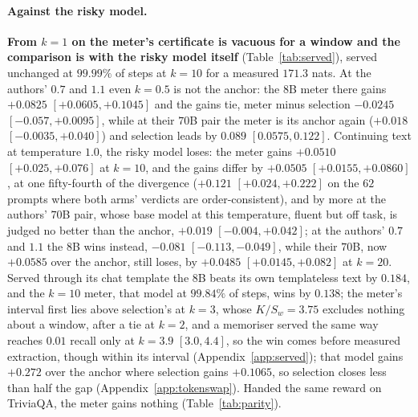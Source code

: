 \paragraph{Against the risky model.} \textbf{From $k=1$ on the meter's certificate is vacuous for a window
and the comparison is with the risky model itself} (Table~\ref{tab:served}), served unchanged at
$99.99\%$ of steps at $k=10$ for a measured $171.3$ nats. At the authors' $0.7$ and $1.1$ even $k=0.5$ is not
the anchor: the $8$B meter there gains $+0.0825$ $[+0.0605, +0.1045]$ and the gains tie, meter minus
selection $-0.0245$ $[-0.057, +0.0095]$, while at their $70$B pair the meter is its anchor again ($+0.018$
$[-0.0035, +0.040]$) and selection leads by $0.089$ $[0.0575, 0.122]$. Continuing text at temperature
$1.0$, the risky model loses: the meter gains $+0.0510$ $[+0.025, +0.076]$ at $k=10$, and the gains differ by $+0.0505$ $[+0.0155, +0.0860]$, at one fifty-fourth of the divergence ($+0.121$
$[+0.024, +0.222]$ on the $62$ prompts where both arms' verdicts are order-consistent), and by more at the
authors' $70$B pair, whose base model at this temperature, fluent but off task, is judged no better than the
anchor, $+0.019$ $[-0.004, +0.042]$; at the authors' $0.7$ and $1.1$ the $8$B wins instead, $-0.081$ $[-0.113, -0.049]$, while their $70$B, now $+0.0585$ over the anchor, still loses, by $+0.0485$ $[+0.0145, +0.082]$ at $k=20$. Served through its chat
template the $8$B beats its own templateless text by $0.184$, and the $k=10$ meter, that model at
$99.84\%$ of steps, wins by $0.138$; the meter's interval first lies above selection's at $k=3$,
whose $K/S_w = 3.75$ excludes nothing about a window, after a tie at $k=2$, and a memoriser served the same
way reaches $0.01$ recall only at $k=3.9$ $[3.0, 4.4]$, so the win comes before measured extraction, though within its interval
(Appendix~\ref{app:served}); that model gains $+0.272$ over the anchor where selection
gains $+0.1065$, so selection closes less than half the gap (Appendix~\ref{app:tokenswap}). Handed the
same reward on TriviaQA, the meter gains nothing (Table~\ref{tab:parity}).


